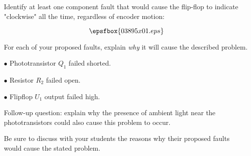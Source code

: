 

Identify at least one component fault that would cause the flip-flop to indicate "clockwise" all the time, regardless of encoder motion:

$$\epsfbox{03895x01.eps}$$

For each of your proposed faults, explain {\it why} it will cause the described problem.







\medskip
\item{$\bullet$} Phototransistor $Q_1$ failed shorted.
\vskip 5pt
\item{$\bullet$} Resistor $R_2$ failed open.
\vskip 5pt
\item{$\bullet$} Flipflop $U_1$ output failed high.
\medskip

\vskip 10pt

Follow-up question: explain why the presence of ambient light near the phototransistors could also cause this problem to occur.







Be sure to discuss with your students the reasons why their proposed faults would cause the stated problem.




